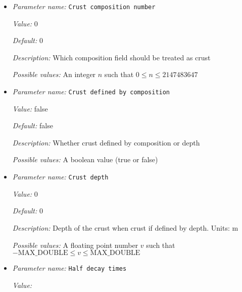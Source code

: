 \begin{itemize}
\item {\it Parameter name:} {\tt Crust composition number}
\label{parameters:Heating model/Radioactive decay/Crust composition number}
\label{parameters:Heating_20model/Radioactive_20decay/Crust_20composition_20number}


{\it Value:} 0


{\it Default:} 0


{\it Description:} Which composition field should be treated as crust


{\it Possible values:} An integer $n$ such that $0\leq n \leq 2147483647$
\item {\it Parameter name:} {\tt Crust defined by composition}
\label{parameters:Heating model/Radioactive decay/Crust defined by composition}
\label{parameters:Heating_20model/Radioactive_20decay/Crust_20defined_20by_20composition}


{\it Value:} false


{\it Default:} false


{\it Description:} Whether crust defined by composition or depth


{\it Possible values:} A boolean value (true or false)
\item {\it Parameter name:} {\tt Crust depth}
\label{parameters:Heating model/Radioactive decay/Crust depth}
\label{parameters:Heating_20model/Radioactive_20decay/Crust_20depth}


{\it Value:} 0


{\it Default:} 0


{\it Description:} Depth of the crust when crust if defined by depth. Units: m


{\it Possible values:} A floating point number $v$ such that $-\text{MAX\_DOUBLE} \leq v \leq \text{MAX\_DOUBLE}$
\item {\it Parameter name:} {\tt Half decay times}
\label{parameters:Heating model/Radioactive decay/Half decay times}
\label{parameters:Heating_20model/Radioactive_20decay/Half_20decay_20times}


{\it Value:} 



\end{itemize}

